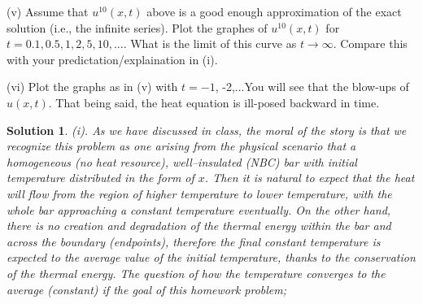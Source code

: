 \documentclass[6pt]{article}
\newtheorem{solution}{Solution}
\numberwithin{equation}{section}
\begin{document}
\begin{enumerate}
(v)  Assume that $u^{10}(x,t)$ above is a good enough approximation of the exact solution (i.e., the infinite series).  Plot the graphes of $u^{10}(x,t)$ for $t=0.1,0.5,1,2,5,10,...$. What is the limit of this curve as $t\rightarrow \infty$.  Compare this with your predictation/explaination in (i).

(vi) Plot the graphs as in (v) with $t=-1$, -2,...You will see that the blow-ups of $u(x,t)$.   That being said, the heat equation is ill-posed backward in time.
\begin{solution}
(i).  As we have discussed in class, the moral of the story is that we recognize this problem as one arising from the physical scenario that a homogeneous (no heat resource), well--insulated (NBC) bar with initial temperature distributed in the form of $x$.  Then it is natural to expect that the heat will flow from the region of higher temperature to lower temperature, with the whole bar approaching a constant temperature eventually.  On the other hand, there is no creation and degradation of the thermal energy within the bar and across the boundary (endpoints), therefore the final constant temperature is expected to the average value of the initial temperature, thanks to the conservation of the thermal energy.  The question of how the temperature converges to the average (constant) if the goal of this homework problem;


\end{solution}
\end{enumerate}
\end{document}
